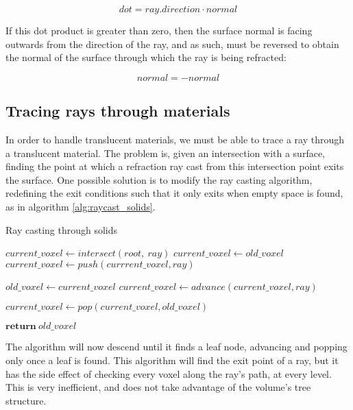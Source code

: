 \[
	dot = ray.direction \cdot normal
\]

If this dot product is greater than zero, then the surface normal is facing outwards from the direction of the ray, and as such, must be reversed to obtain the normal of the surface through which the ray is being refracted:

\[
	normal = -normal
\]

\subsection{Tracing rays through materials}
In order to handle translucent materials, we must be able to trace a ray through a translucent material. The problem is, given an intersection with a surface, finding the point at which a refraction ray cast from this intersection point exits the surface. One possible solution is to modify the ray casting algorithm, redefining the exit conditions such that it only exits when empty space is found, as in algorithm \ref{alg:raycast_solids}.

\begin{algorithm}
\caption{Ray casting through solids}
\label{alg:raycast_solids}
\begin{algorithmic}[1]
	\State $current\_voxel \gets intersect(root,~ray)$			
	 
			\State $current\_voxel \gets old\_voxel$
			\State $current\_voxel \gets push(currrent\_voxel, ray)$		
		\EndIf

		\State $old\_voxel \gets current\_voxel$
		\State $current\_voxel \gets advance(current\_voxel, ray)$			

			\State $current\_voxel \gets pop(current\_voxel, old\_voxel)$			
		\EndIf

					
			\State $\textbf{return}~old\_voxel$
		\EndIf
	\EndWhile
\EndProcedure
\end{algorithmic}
\end{algorithm}

The algorithm will now descend until it finds a leaf node, advancing and popping only once a leaf is found. This algorithm will find the exit point of a ray, but it has the side effect of checking every voxel along the ray's path, at every level. This is very inefficient, and does not take advantage of the volume's tree structure.


